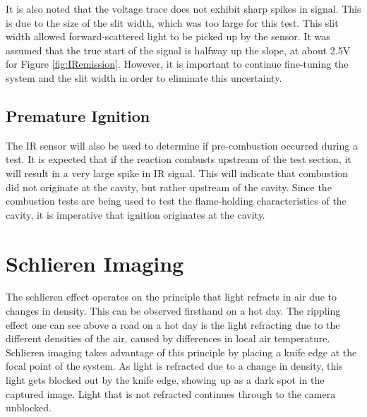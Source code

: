 It is also noted that the voltage trace does not exhibit sharp spikes in signal. This is due to the size of the slit width, which was too large for this test. This slit width allowed forward-scattered light to be picked up by the sensor. It was assumed that the true start of the signal is halfway up the slope, at about 2.5V for Figure \ref{fig:IRemission}. However, it is important to continue fine-tuning the system and the slit width in order to eliminate this uncertainty.

\subsection{Premature Ignition}

The IR sensor will also be used to determine if pre-combustion occurred during a test. It is expected that if the reaction combusts upstream of the test section, it will result in a very large spike in IR signal. This will indicate that combustion did not originate at the cavity, but rather upstream of the cavity. Since the combustion tests are being used to test the flame-holding characteristics of the cavity, it is imperative that ignition originates at the cavity. 



\section{Schlieren Imaging} \label{Schlieren}
The schlieren effect operates on the principle that light refracts in air due to changes in density. This can be observed firsthand on a hot day. The rippling effect one can see above a road on a hot day is the light refracting due to the different densities of the air, caused by differences in local air temperature. Schlieren imaging takes advantage of this principle by placing a knife edge at the focal point of the system. As light is refracted due to a change in density, this light gets blocked out by the knife edge, showing up as a dark spot in the captured image. Light that is not refracted continues through to the camera unblocked. 

